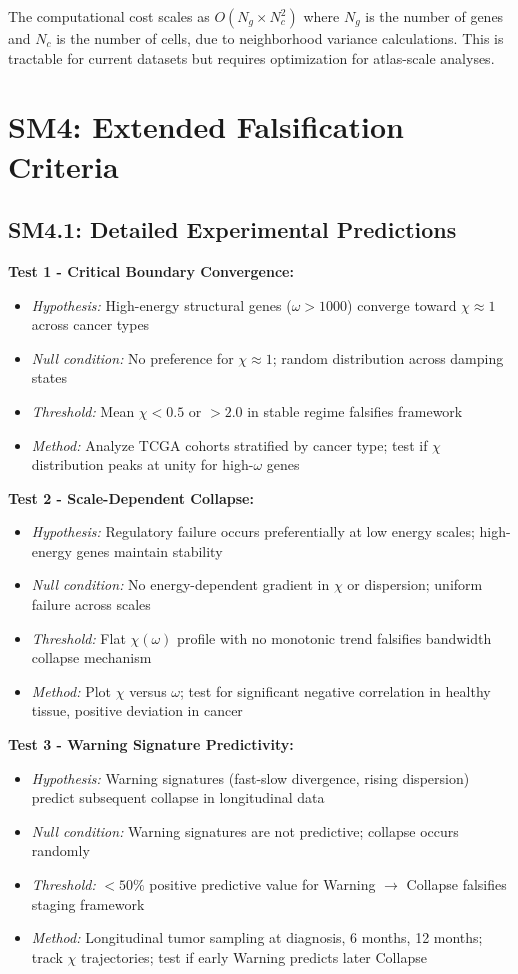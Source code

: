 \documentclass[11pt,letterpaper]{article}
\begin{document}
The computational cost scales as $O(N_g \times N_c^2)$ where $N_g$ is the number of genes and $N_c$ is the number of cells, due to neighborhood variance calculations. This is tractable for current datasets but requires optimization for atlas-scale analyses.

\section{SM4: Extended Falsification Criteria}

\subsection{SM4.1: Detailed Experimental Predictions}

\textbf{Test 1 - Critical Boundary Convergence:}
\begin{itemize}
\item \textit{Hypothesis:} High-energy structural genes ($\omega > 1000$) converge toward $\chi \approx 1$ across cancer types
\item \textit{Null condition:} No preference for $\chi \approx 1$; random distribution across damping states
\item \textit{Threshold:} Mean $\chi < 0.5$ or $> 2.0$ in stable regime falsifies framework
\item \textit{Method:} Analyze TCGA cohorts stratified by cancer type; test if $\chi$ distribution peaks at unity for high-$\omega$ genes
\end{itemize}

\textbf{Test 2 - Scale-Dependent Collapse:}
\begin{itemize}
\item \textit{Hypothesis:} Regulatory failure occurs preferentially at low energy scales; high-energy genes maintain stability
\item \textit{Null condition:} No energy-dependent gradient in $\chi$ or dispersion; uniform failure across scales
\item \textit{Threshold:} Flat $\chi(\omega)$ profile with no monotonic trend falsifies bandwidth collapse mechanism
\item \textit{Method:} Plot $\chi$ versus $\omega$; test for significant negative correlation in healthy tissue, positive deviation in cancer
\end{itemize}

\textbf{Test 3 - Warning Signature Predictivity:}
\begin{itemize}
\item \textit{Hypothesis:} Warning signatures (fast-slow divergence, rising dispersion) predict subsequent collapse in longitudinal data
\item \textit{Null condition:} Warning signatures are not predictive; collapse occurs randomly
\item \textit{Threshold:} $<50\%$ positive predictive value for Warning $\to$ Collapse falsifies staging framework
\item \textit{Method:} Longitudinal tumor sampling at diagnosis, 6 months, 12 months; track $\chi$ trajectories; test if early Warning predicts later Collapse
\end{itemize}
\end{document}
